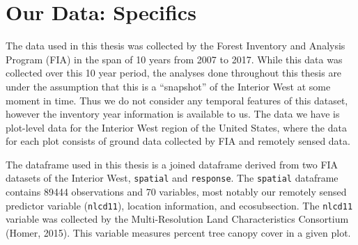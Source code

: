 \documentclass[12pt,twoside]{reedthesis}
\begin{document}
\hypertarget{our-data-specifics}{%
\section{Our Data: Specifics}\label{our-data-specifics}}

The data used in this thesis was collected by the Forest Inventory and Analysis Program (FIA) in the span of 10 years from 2007 to 2017. While this data was collected over this 10 year period, the analyses done throughout this thesis are under the assumption that this is a ``snapshot'' of the Interior West at some moment in time. Thus we do not consider any temporal features of this dataset, however the inventory year information is available to us. The data we have is plot-level data for the Interior West region of the United States, where the data for each plot consists of ground data collected by FIA and remotely sensed data.

The dataframe used in this thesis is a joined dataframe derived from two FIA datasets of the Interior West, \texttt{spatial} and \texttt{response}. The \texttt{spatial} dataframe contains 89444 observations and 70 variables, most notably our remotely sensed predictor variable (\texttt{nlcd11}), location information, and ecosubsection. The \texttt{nlcd11} variable was collected by the Multi-Resolution Land Characteristics Consortium (Homer, 2015). This variable measures percent tree canopy cover in a given plot.
\end{document}
